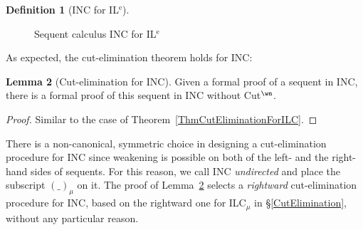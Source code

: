 \documentclass[a4paper]{article}
\theoremstyle{definition}
\newtheorem{definition}{Definition}[section]
\theoremstyle{theorem}
\newtheorem{lemma}[definition]{Lemma}
\theoremstyle{remark}
\begin{document}
\begin{definition}[\textsf{INC} for IL$^{\text{e}}$]
\begin{figure}
\begin{center}
\end{center}
\caption{Sequent calculus \textsf{INC} for IL$^{\text{e}}$}
\label{FigILK_mu}
\end{figure}
\end{definition}

As expected, the cut-elimination theorem holds for \textsf{INC}:
\begin{lemma}[Cut-elimination for \textsf{INC}]
\label{LemCutEliminationForINC_mu}
Given a formal proof of a sequent in \textsf{INC}, there is a formal proof of this sequent in \textsf{INC} without Cut$^\wn$.
\end{lemma}
\begin{proof}
Similar to the case of Theorem~\ref{ThmCutEliminationForILC}.
\end{proof}

There is a non-canonical, symmetric choice in designing a cut-elimination procedure for \textsf{INC} since weakening is possible on both of the left- and the right-hand sides of sequents.
For this reason, we call \textsf{INC} \emph{undirected} and place the subscript $(\_)_\mu$ on it.
The proof of Lemma~\ref{LemCutEliminationForINC_mu} selects a \emph{rightward} cut-elimination procedure for \textsf{INC}, based on the rightward one for \textsf{ILC$_\mu$} in \S\ref{CutElimination}, without any particular reason.
\fi
\end{document}
